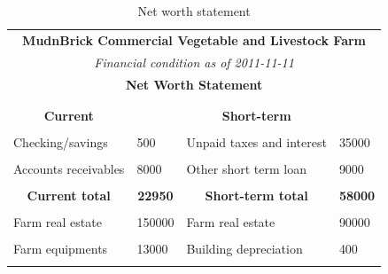 \documentclass[
]{article}
\begin{document}
\begin{minipage}[c]{\textwidth}
{\begin{minipage}{0.7\textwidth}
\begin{table}[H]
\caption{\label{tab:net-worth-state}Net worth statement}
\centering
\fontsize{8}{10}\selectfont
\begin{tabular}[t]{llll}
\toprule
\multicolumn{4}{c}{\textbf{MudnBrick Commercial Vegetable and Livestock Farm}} \\
\cmidrule(l{3pt}r{3pt}){1-4}
\multicolumn{4}{c}{\em{Financial condition as of 2011-11-11}} \\
\cmidrule(l{3pt}r{3pt}){1-4}
\multicolumn{4}{c}{\textbf{Net Worth Statement}} \\
\cmidrule(l{3pt}r{3pt}){1-4}
 &  &  \vphantom{1}& \\
\midrule
\cellcolor{gray!6}{Assets} & \cellcolor{gray!6}{Market value} & \cellcolor{gray!6}{Liabilities} & \cellcolor{gray!6}{Amount}\\
\multicolumn{1}{c}{\textbf{Current}} & \multicolumn{1}{c}{\textbf{}} & \multicolumn{1}{c}{\textbf{Short-term}} & \multicolumn{1}{c}{\textbf{}}\\
\cellcolor{gray!6}{Cash in hand} & \cellcolor{gray!6}{450} & \cellcolor{gray!6}{Accounts payable} & \cellcolor{gray!6}{14000}\\
Checking/savings & 500 & Unpaid taxes and interest & 35000\\
\cellcolor{gray!6}{Inventory} & \cellcolor{gray!6}{9000} & \cellcolor{gray!6}{Veterinary fees} & \cellcolor{gray!6}{0}\\
\addlinespace
Accounts receivables & 8000 & Other short term loan & 9000\\
\cellcolor{gray!6}{Cash at bank} & \cellcolor{gray!6}{5000} & \cellcolor{gray!6}{} & \cellcolor{gray!6}{}\\
\multicolumn{1}{c}{\textbf{Current total}} & \multicolumn{1}{c}{\textbf{22950}} & \multicolumn{1}{c}{\textbf{Short-term total}} & \multicolumn{1}{c}{\textbf{58000}}\\
\cellcolor{gray!6}{Non-current/Fixed} & \cellcolor{gray!6}{} & \cellcolor{gray!6}{Long term} & \cellcolor{gray!6}{}\\
Farm real estate & 150000 & Farm real estate & 90000\\
\addlinespace
\cellcolor{gray!6}{Tractor} & \cellcolor{gray!6}{1500} & \cellcolor{gray!6}{Automobile loan} & \cellcolor{gray!6}{20000}\\
Farm equipments & 13000 & Building depreciation & 400\\
\cellcolor{gray!6}{Personal property} & \cellcolor{gray!6}{5000} & \cellcolor{gray!6}{Farm animal purchase loan} & \cellcolor{gray!6}{12000}\\

\end{tabular}
\end{table}
\end{minipage}}
\end{minipage}
\end{document}
